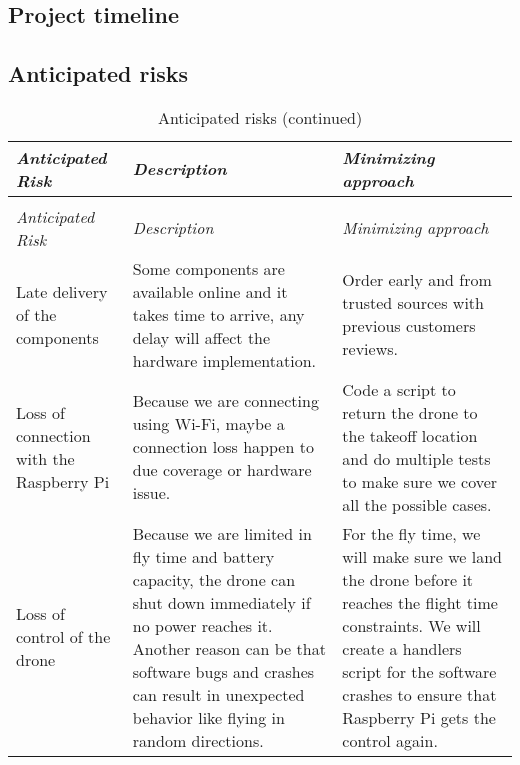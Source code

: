 \documentclass[../main.tex]{subfiles}
\begin{document}
\begin{center}
\begin{xltabular}{\textwidth}{ X p{5cm} p{9cm} }
        \bottomrule
    \end{xltabular}
\end{center}

\subsection{Project timeline}



\subsection{Anticipated risks}

\begin{center}
    \begin{xltabular}{\textwidth}{ X X X }
        \caption{Anticipated risks.}
        \label{tab:risks} \\
        \toprule
        \textit{Anticipated Risk} 
        & \textit{Description} 
        & \textit{Minimizing approach} \\
        \midrule
        \endfirsthead

        \caption[]{Anticipated risks (continued)} \\
        \toprule
        \textit{Anticipated Risk} 
        & \textit{Description} 
        & \textit{Minimizing approach} \\
        \midrule
        \endhead

        Late delivery of the components 
        & Some components are available online 
        and it takes time to arrive, 
        any delay will affect the hardware implementation.
        & Order early and from trusted sources with previous 
        customers reviews. \\
        
        Loss of connection with the Raspberry Pi
        & Because we are connecting using Wi-Fi, 
        maybe a connection loss 
        happen to due coverage or hardware issue.
        & Code a script to return the drone 
        to the takeoff location 
        and do multiple tests to make sure 
        we cover all the possible cases. \\
        
        Loss of control of the drone
        & Because we are limited in fly time 
        and battery capacity, 
        the drone can shut down immediately if 
        no power reaches it.
        Another reason can be that software bugs 
        and crashes can 
        result in unexpected behavior like flying 
        in random directions.
        & For the fly time, we will make sure 
        we land the drone before it reaches 
        the flight time constraints.
        We will create a handlers script 
        for the software crashes 
        to ensure that Raspberry Pi gets the 
        control again.  \\
        

\end{xltabular}
\end{center}
\end{document}
